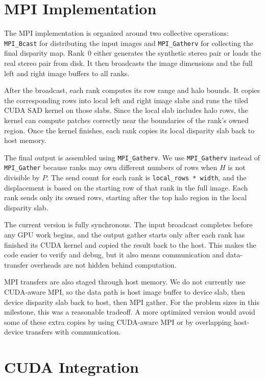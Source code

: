 \documentclass[11pt]{article}
\begin{document}
\section{MPI Implementation}

The MPI implementation is organized around two collective operations:
\texttt{MPI\_Bcast} for distributing the input images and \texttt{MPI\_Gatherv} for
collecting the final disparity map. Rank~0 either generates the synthetic stereo pair
or loads the real stereo pair from disk. It then broadcasts the image dimensions and
the full left and right image buffers to all ranks.

After the broadcast, each rank computes its row range and halo bounds. It copies the
corresponding rows into local left and right image slabs and runs the tiled CUDA SAD
kernel on those slabs. Since the local slab includes halo rows, the kernel can compute
patches correctly near the boundaries of the rank's owned region. Once the kernel
finishes, each rank copies its local disparity slab back to host memory.

The final output is assembled using \texttt{MPI\_Gatherv}. We use
\texttt{MPI\_Gatherv} instead of \texttt{MPI\_Gather} because ranks may own different
numbers of rows when $H$ is not divisible by $P$. The send count for each rank is
\texttt{local\_rows * width}, and the displacement is based on the starting row of
that rank in the full image. Each rank sends only its owned rows, starting after the
top halo region in the local disparity slab.

The current version is fully synchronous. The input broadcast completes before any GPU
work begins, and the output gather starts only after each rank has finished its CUDA
kernel and copied the result back to the host. This makes the code easier to verify
and debug, but it also means communication and data-transfer overheads are not hidden
behind computation.

MPI transfers are also staged through host memory. We do not currently use CUDA-aware
MPI, so the data path is host image buffer to device slab, then device disparity slab
back to host, then MPI gather. For the problem sizes in this milestone, this was a
reasonable tradeoff. A more optimized version would avoid some of these extra copies
by using CUDA-aware MPI or by overlapping host-device transfers with communication.


\section{CUDA Integration}
\end{document}
